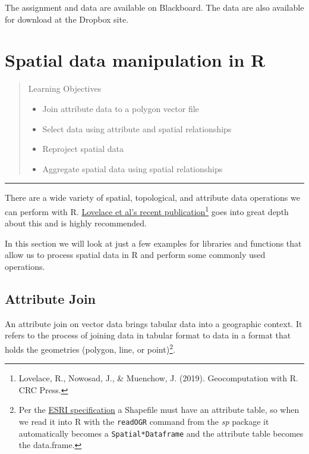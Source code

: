 \documentclass[
  11pt,
]{book}
\providecommand{\tightlist}{%
  \setlength{\itemsep}{0pt}\setlength{\parskip}{0pt}}
\begin{document}
The assignment and data are available on Blackboard. The data are also available for download at the Dropbox site.

\hypertarget{spatialops}{%
\chapter{Spatial data manipulation in R}\label{spatialops}}

\begin{quote}
Learning Objectives

\begin{itemize}
\tightlist
\item
  Join attribute data to a polygon vector file
\item
  Select data using attribute and spatial relationships
\item
  Reproject spatial data
\item
  Aggregate spatial data using spatial relationships
\end{itemize}
\end{quote}

\begin{center}\rule{0.5\linewidth}{0.5pt}\end{center}

There are a wide variety of spatial, topological, and attribute data operations we can perform with R. \href{https://geocompr.robinlovelace.net}{Lovelace et al's recent publication}\footnote{Lovelace, R., Nowosad, J., \& Muenchow, J. (2019). Geocomputation with R. CRC Press.} goes into great depth about this and is highly recommended.

In this section we will look at just a few examples for libraries and functions that allow us to process spatial data in R and perform some commonly used operations.

\hypertarget{attribute-join}{%
\section{Attribute Join}\label{attribute-join}}

An attribute join on vector data brings tabular data into a geographic context. It refers to the process of joining data in tabular format to data in a format that holds the geometries (polygon, line, or point)\footnote{Per the \href{http://www.esri.com/library/whitepapers/pdfs/shapefile.pdf}{ESRI specification} a Shapefile must have an attribute table, so when we read it into R with the \texttt{readOGR} command from the \emph{sp} package it automatically becomes a \texttt{Spatial*Dataframe} and the attribute table becomes the data.frame.}.
\end{document}

